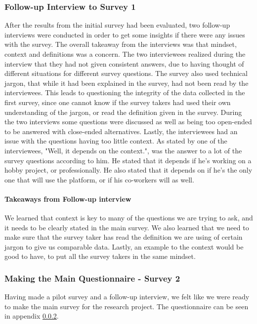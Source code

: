 \documentclass{article}
\begin{document}
\subsubsection{Follow-up Interview to Survey 1}

After the results from the initial survey had been evaluated, two follow-up interviews were
conducted in order to get some insights if there were any issues with
the survey. The overall takeaway from the interviews was that
mindset, context and definitions was a concern. The two interviewees realized during the interview that they had not given consistent answers, due to having thought of different situations for different survey questions. The survey also used technical jargon, that while it had been explained in the survey, had not been read by the interviewees. This leads to questioning the integrity of the data collected in the first survey, since one cannot know if the survey takers had used their own understanding of the jargon, or read the definition given in the survey. During the two interviews some questions were discussed as well as being too open-ended to be answered with close-ended alternatives. Lastly, the interviewees had an issue with the questions having too little context. As stated by one of the interviewees, "Well, it depends on the context.", was the answer to a lot of the survey questions according to him. He stated that it depends if he's working on a hobby project, or professionally. He also stated that it depends on if he's the only one that will use the platform, or if his co-workers will as well.

\paragraph{Takeaways from Follow-up interview}

We learned that context is key to many of the questions we are trying to ask, and it needs to be clearly stated in the main survey. We also learned that we need to make sure that the survey taker has read the definition we are using of certain jargon to give us comparable data. Lastly, an example to the context would be good to have, to put all the survey takers in the same mindset.

\subsubsection{Making the Main Questionnaire - Survey 2}

Having made a pilot survey and a follow-up interview, we felt like we were ready to make the main survey for the research project.
The questionnaire can be seen in appendix \ref{}.
\end{document}
